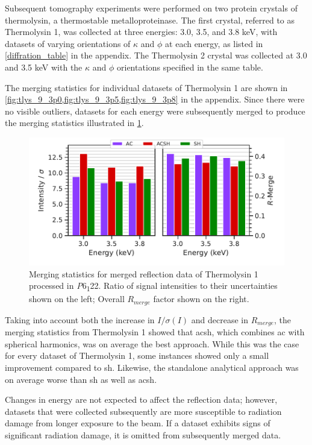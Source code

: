 Subsequent tomography experiments were performed on two protein crystals of thermolysin, a thermostable metalloproteinase. The first crystal, referred to as Thermolysin 1, was collected at three energies: 3.0, 3.5, and 3.8 \unit{keV}, with datasets of varying orientations of $\kappa$ and $\phi$ at each energy, as listed in \cref{diffration_table} in the appendix. The Thermolysin 2 crystal was collected at 3.0 and 3.5 \unit{keV} with the $\kappa$ and $\phi$ orientations specified in the same table.

The merging statistics for individual datasets of Thermolysin 1 are shown in \cref{fig:tlys_9_3p0,fig:tlys_9_3p5,fig:tlys_9_3p8} in the appendix. Since there were no visible outliers, datasets for each energy were subsequently merged to produce the merging statistics illustrated in \cref{fig:tlys_9_stats}.%

\begin{figure}
    \centering
    \includegraphics{plots/exp1/tlys_9_P6122/merged_stats.pdf}
    \caption{Merging statistics for merged reflection data of Thermolysin 1 processed in \textit{P}6\textsubscript{1}22. Ratio of signal intensities to their uncertainties shown on the left; Overall $R_{merge}$ factor shown on the right.}
    \label{fig:tlys_9_stats}
\end{figure}


Taking into account both the increase in $I/\sigma(I)$ and decrease in $R_{merge}$, the merging statistics from Thermolysin 1 showed that \ac{acsh}, which combines \ac{ac} with spherical harmonics, was on average the best approach. While this was the case for every dataset of Thermolysin 1, some instances showed only a small improvement compared to \ac{sh}. Likewise, the standalone analytical approach was on average worse than \ac{sh} as well as \ac{acsh}.

Changes in energy are not expected to affect the reflection data; however, datasets that were collected subsequently are more susceptible to radiation damage from longer exposure to the beam. If a dataset exhibits signs of significant radiation damage, it is omitted from subsequently merged data.%

